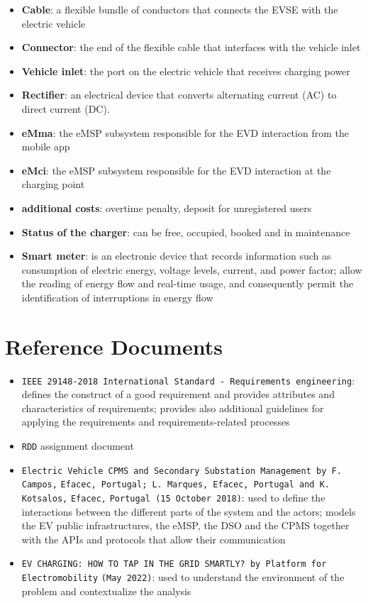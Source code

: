 \begin{itemize}
    \item \textbf{Cable}: a flexible bundle of conductors that connects the EVSE with the electric vehicle
    \item \textbf{Connector}: the end of the flexible cable that interfaces with the vehicle inlet
    \item \textbf{Vehicle inlet}: the port on the electric vehicle that receives charging power
    \item \textbf{Rectifier}: an electrical device that converts alternating current (AC) to direct current (DC).
    \item \textbf{eMma}: the eMSP subsystem responsible for the EVD interaction from the mobile app
    \item \textbf{eMci}: the eMSP subsystem responsible for the EVD interaction at the charging point
    \item \textbf{additional costs}: overtime penalty, deposit for unregistered users
    \item \textbf{Status of the charger}: can be free, occupied, booked and in maintenance
    \item \textbf{Smart meter}: is an electronic device that records information such as consumption of electric energy, voltage levels, current, and power factor; allow the reading of energy flow and real-time usage, and consequently permit the identification of interruptions in energy flow
\end{itemize}

\section{Reference Documents}
\label{sec:Reference Documents}%
\begin{itemize}
    \item \verb|IEEE 29148-2018 International Standard - Requirements engineering|: defines the construct of a good requirement and provides attributes and characteristics of requirements; provides also additional guidelines for applying the requirements and requirements-related processes
    \item \verb|RDD| assignment document
    \item \verb|Electric Vehicle CPMS and Secondary Substation Management by F. Campos,| \verb|Efacec, Portugal; L. Marques, Efacec, Portugal and K. Kotsalos,| \verb|Efacec,| \verb|Portugal (15 October 2018)|: used to define the interactions between the different parts of the system and the actors; models the EV public infrastructures, the eMSP, the DSO and the CPMS together with the APIs and protocols that allow their communication
    \item \verb|EV CHARGING: HOW TO TAP IN THE GRID SMARTLY? by Platform |\verb|for|\\\verb|Electromobility| \verb|(May 2022)|: used to understand the environment of the problem and contextualize the analysis
\end{itemize}

